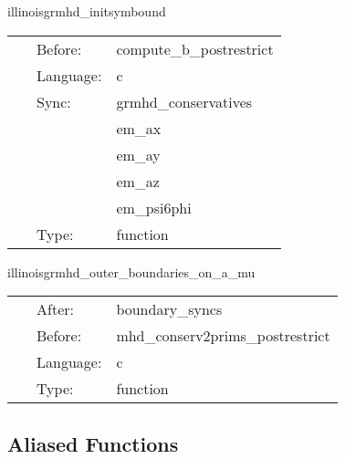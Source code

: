 \documentclass{article}
\begin{document}
\vspace{5mm}


\hspace{5mm} illinoisgrmhd\_initsymbound 

\hspace{5mm}{\it schedule symmetries -- actually just a placeholder function to ensure prolongations / processor syncs are done before outer boundaries are updated. } 


\hspace{5mm}

 \begin{tabular*}{160mm}{cll} 
~ & Before:  & compute\_b\_postrestrict \\ 
~ & Language:  & c \\ 
~ & Sync:  & grmhd\_conservatives \\ 
~& ~ &em\_ax\\ 
~& ~ &em\_ay\\ 
~& ~ &em\_az\\ 
~& ~ &em\_psi6phi\\ 
~ & Type:  & function \\ 
\end{tabular*} 


\vspace{5mm}


\hspace{5mm} illinoisgrmhd\_outer\_boundaries\_on\_a\_mu 



\hspace{5mm}

 \begin{tabular*}{160mm}{cll} 
~ & After:  & boundary\_syncs \\ 
~ & Before:  & mhd\_conserv2prims\_postrestrict \\ 
~ & Language:  & c \\ 
~ & Type:  & function \\ 
\end{tabular*} 


\subsection*{Aliased Functions}
\end{document}
